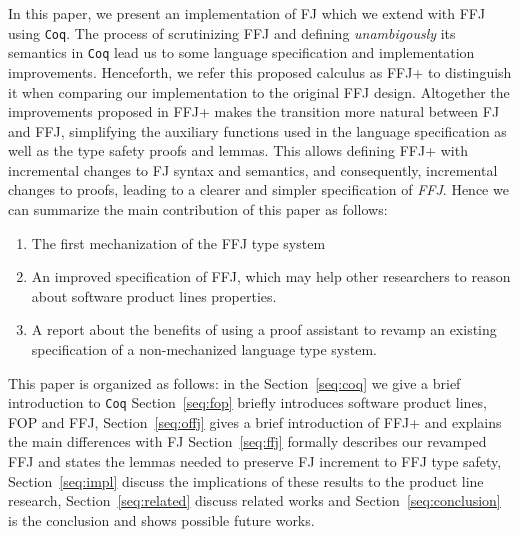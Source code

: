 In this paper, we present an implementation of \ac{FJ} which we extend with \ac{FFJ} using \texttt{Coq}.
The process of scrutinizing \ac{FFJ} and defining \textit{unambigously} its semantics in \texttt{Coq} 
lead us to some language specification and implementation improvements. 
Henceforth, we refer this proposed calculus as \ac{FFJ+} to distinguish it when comparing our implementation to the original \ac{FFJ} design.
Altogether the improvements proposed in \ac{FFJ+} makes the transition more natural between \ac{FJ} and \ac{FFJ}, 
simplifying the auxiliary functions used in the language specification as well as the type safety proofs and lemmas. 
This allows defining \ac{FFJ+} with incremental changes to \ac{FJ} syntax and semantics, 
and consequently, incremental changes to proofs, leading to a clearer and simpler specification of \textit{FFJ}.
Hence we can summarize the main contribution of this paper as follows:
\begin{enumerate}
    \item The first mechanization of the \ac{FFJ} type system
    \item An improved specification of FFJ, which may help other researchers to reason about software product lines properties.
    \item A report about the benefits of using a proof assistant 
    to revamp an existing specification of a non-mechanized language type system.
\end{enumerate}

This paper is organized as follows: in the Section~\ref{seq:coq} we give a brief introduction to \texttt{Coq} 
Section~\ref{seq:fop} briefly introduces software product lines, \ac{FOP} and \ac{FFJ},
Section~\ref{seq:offj} gives a brief introduction of  \ac{FFJ+} and explains the main differences with \ac{FJ}
Section~\ref{seq:ffj} formally describes our revamped \ac{FFJ} and states the lemmas needed to preserve \ac{FJ} increment to \ac{FFJ} type safety, 
Section~\ref{seq:impl} discuss the implications of these results to the product line research,
Section~\ref{seq:related} discuss related works and
Section~\ref{seq:conclusion} is the conclusion and shows possible future works.
